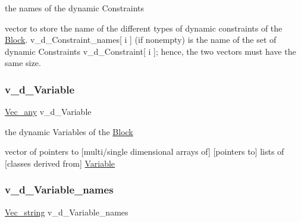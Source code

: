 the names of the dynamic Constraints 

vector to store the name of the different types of dynamic constraints of the \mbox{\hyperlink{class_s_m_spp__di__unipi__it_1_1_block}{Block}}. v\+\_\+d\+\_\+\+Constraint\+\_\+names\mbox{[} i \mbox{]} (if nonempty) is the name of the set of dynamic Constraints v\+\_\+d\+\_\+\+Constraint\mbox{[} i \mbox{]}; hence, the two vectors must have the same size. \mbox{\label{class_s_m_spp__di__unipi__it_1_1_block_a32aca41999835a4f1e86b4bb0c7f26fa}} 
\subsubsection{\texorpdfstring{v\+\_\+d\+\_\+\+Variable}{v\_d\_Variable}}
{\footnotesize\ttfamily \mbox{\hyperlink{group___s_m_s__types_ga58ded0963812566c064a5177b2f84c28}{Vec\+\_\+any}} v\+\_\+d\+\_\+\+Variable\hspace{0.3cm}{\ttfamily [private]}}



the dynamic Variables of the \mbox{\hyperlink{class_s_m_spp__di__unipi__it_1_1_block}{Block}} 

vector of pointers to \mbox{[}multi/single dimensional arrays of\mbox{]} \mbox{[}pointers to\mbox{]} lists of \mbox{[}classes derived from\mbox{]} \mbox{\hyperlink{class_s_m_spp__di__unipi__it_1_1_variable}{Variable}} \mbox{\label{class_s_m_spp__di__unipi__it_1_1_block_a4acc71bcb78183476ae9450b6aeeb01d}} 
\subsubsection{\texorpdfstring{v\+\_\+d\+\_\+\+Variable\+\_\+names}{v\_d\_Variable\_names}}
{\footnotesize\ttfamily \mbox{\hyperlink{group___s_m_s__types_ga36068d46bc6e7ba661efe0093c7a8beb}{Vec\+\_\+string}} v\+\_\+d\+\_\+\+Variable\+\_\+names\hspace{0.3cm}{\ttfamily [protected]}}



